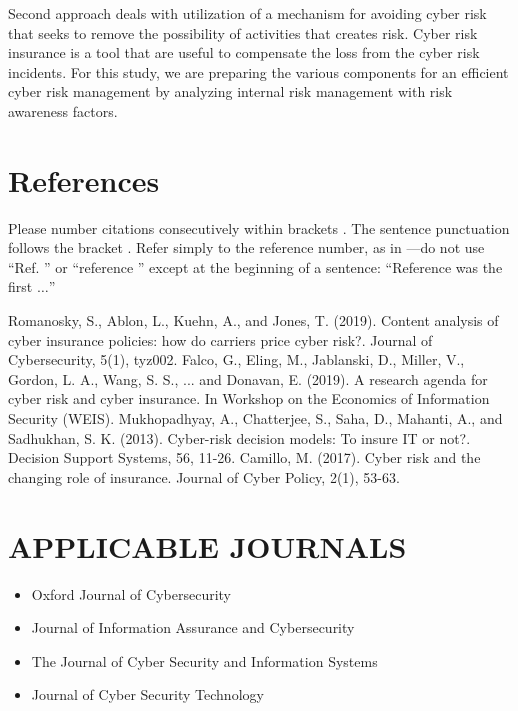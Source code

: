 \documentclass[conference]{IEEEtran}
\begin{document}
Second approach deals with utilization of a mechanism for avoiding cyber risk that seeks to remove the possibility of activities that creates risk\cite{b3}. Cyber risk insurance is a tool that are useful to compensate the loss from the cyber risk incidents\cite{b3}\cite{b4}. For this study, we are preparing the various components for an efficient cyber risk management by analyzing internal risk management with risk awareness factors.  


\section*{References}

Please number citations consecutively within brackets \cite{b1}. The 
sentence punctuation follows the bracket \cite{b2}. Refer simply to the reference 
number, as in \cite{b3}---do not use ``Ref. \cite{b3}'' or ``reference \cite{b3}'' except at 
the beginning of a sentence: ``Reference \cite{b3} was the first $\ldots$''


\begin{thebibliography}{00}
 Romanosky, S., Ablon, L., Kuehn, A., and Jones, T. (2019). Content analysis of cyber insurance policies: how do carriers price cyber risk?. Journal of Cybersecurity, 5(1), tyz002.
 Falco, G., Eling, M., Jablanski, D., Miller, V., Gordon, L. A., Wang, S. S., ... and Donavan, E. (2019). A research agenda for cyber risk and cyber insurance. In Workshop on the Economics of Information Security (WEIS).
 Mukhopadhyay, A., Chatterjee, S., Saha, D., Mahanti, A., and Sadhukhan, S. K. (2013). Cyber-risk decision models: To insure IT or not?. Decision Support Systems, 56, 11-26.
 Camillo, M. (2017). Cyber risk and the changing role of insurance. Journal of Cyber Policy, 2(1), 53-63.

\end{thebibliography}

\section{APPLICABLE JOURNALS}
\begin{itemize}
    \item Oxford Journal of Cybersecurity
    \item Journal of Information Assurance and Cybersecurity
    \item The Journal of Cyber Security and Information Systems
    \item Journal of Cyber Security Technology

\end{itemize}
\end{document}
